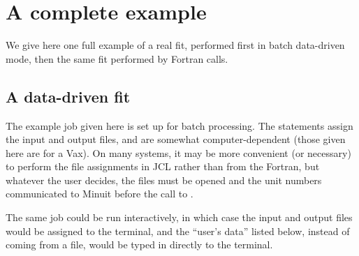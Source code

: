  
\chapter{A complete example}
 
We give here one full example of a real fit, performed first in batch
data-driven mode, then the same fit performed by Fortran calls.

\section{A data-driven fit}

The example job given here is set up for batch processing.
The  statements assign the input and output files, and are
somewhat computer-dependent (those given here are for a Vax).
On many systems, it may be more convenient (or necessary)
to perform the file assignments in JCL rather than from the Fortran,
but whatever the user decides,
the files must be opened and the unit numbers
communicated to Minuit before the call to .
 
The same job could be run interactively, in which case the input
and output files would be assigned to the terminal,
and the ``user's data'' listed below, instead of coming from a file,
would be typed in directly to the terminal.


